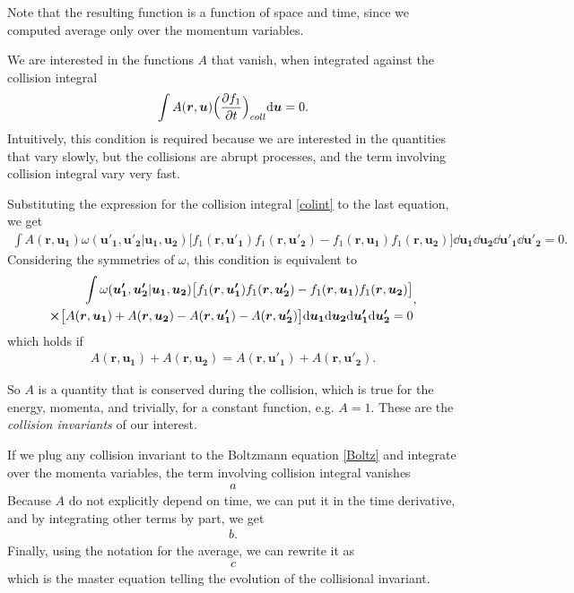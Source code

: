 Note that the resulting function is a function of space and time, since we computed average only over the momentum variables.

We are interested in the functions $A$ that vanish, when integrated against the collision integral
\begin{align*}
\int A(\bm{r},\bm{u})  \Big( \frac{\partial f_1}{\partial t} \Big)_{coll} \mathrm{d} \bm{u} = 0.
\end{align*}
Intuitively, this condition is required because we are interested in the quantities that vary slowly, but the collisions are abrupt processes, and the term involving collision integral vary very fast.


Substituting the expression for the collision integral \ref{colint} to the last equation, we get
\begin{align*}
\int A(\bm{r},\bm{u_1}) \omega(\bm{u'_1},\bm{u'_2} | \bm{u_1}, \bm{u_2}) \big[f_1(\bm{r},\bm{u'_1})f_1(\bm{r},\bm{u'_2}) - f_1(\bm{r},\bm{u_1})f_1(\bm{r},\bm{u_2}) \big] \dd \bm{u_1} \dd \bm{u_2} \dd \bm{u'_1} \dd \bm{u'_2} = 0.
\end{align*}
Considering the symmetries of $\omega$, this condition is equivalent to
\begin{align*}
\begin{split}
\int \omega(\bm{u'_1},\bm{u'_2} | \bm{u_1}, \bm{u_2}) \big[f_1(\bm{r},\bm{u'_1})f_1(\bm{r},\bm{u'_2}) - f_1(\bm{r},\bm{u_1})f_1(\bm{r},\bm{u_2}) \big] \\ \cross \big[A(\bm{r},\bm{u_1}) + A(\bm{r},\bm{u_2}) - A(\bm{r},\bm{u'_1}) - A(\bm{r},\bm{u'_2}) \big] \mathrm{d} \bm{u_1} \mathrm{d} \bm{u_2} \mathrm{d} \bm{u'_1} \mathrm{d} \bm{u'_2} = 0
\end{split},
\end{align*}
which holds if
\begin{align*}
A(\bm{r},\bm{u_1}) + A(\bm{r},\bm{u_2}) = A(\bm{r},\bm{u'_1}) + A(\bm{r},\bm{u'_2}).
\end{align*}

So $A$ is a quantity that is conserved during the collision, which is true for the energy, momenta, and trivially, for a constant function, e.g. $A=1$.
These are the \textit{collision invariants} of our interest.

If we plug any collision invariant to the Boltzmann equation \ref{Boltz} and integrate over the momenta variables, the term involving collision integral vanishes
\begin{align*}
a
\end{align*} 
Because $A$ do not explicitly depend on time, we can put it in the time derivative, and by integrating other terms by part, we get
\begin{align*}
b.
\end{align*}
Finally, using the notation for the average, we can rewrite it as
\begin{align} \label{master}
c
\end{align}
which is the master equation telling the evolution of the collisional invariant.

